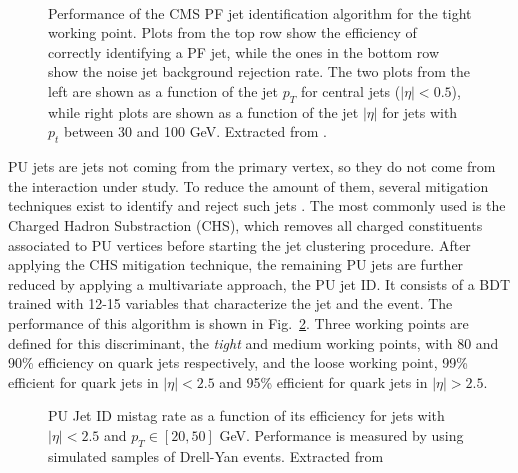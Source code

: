 \documentclass[../main.tex]{subfiles}
\begin{document}
\begin{figure}[h!]
\begin{center}
\\
\end{center}
\caption[Performance of the CMS PF jet identification algorithm]{Performance of the CMS PF jet identification algorithm for the tight working point. Plots from the top row show the efficiency of correctly identifying a PF jet, while the ones in the bottom row show the noise jet background rejection rate. The two plots from the left are shown as a function of the jet $p_T$ for central jets ($|\eta|<0.5$), while right plots are shown as a function of the jet $|\eta|$ for jets with $p_t$ between 30 and 100 GeV. Extracted from \cite{intro:id:pfjetid}.}
\label{intro:fig:jetid}
\end{figure}

PU jets are jets not coming from the primary vertex, so they do not come from the interaction under study. To reduce the amount of them, several mitigation techniques exist to identify and reject such jets \cite{intro:id:pujet}. The most commonly used is the Charged Hadron Substraction (CHS), which removes all charged constituents associated to PU vertices before starting the jet clustering procedure. After applying the CHS mitigation technique, the remaining PU jets are further reduced by applying a multivariate approach, the PU jet ID. It consists of a BDT trained with 12-15 variables that characterize the jet and the event. The performance of this algorithm is shown in Fig.~\ref{intro:fig:pujetid}.  Three working points are defined for this discriminant, the \textit{tight} and medium working points, with 80 and 90\% efficiency on quark jets respectively, and the loose working point, 99\% efficient for quark jets in $|\eta|<2.5$ and 95\% efficient for quark jets in $|\eta|>2.5$.


\begin{figure}[h!]
\begin{center}
\end{center}
\caption[PU Jet ID mistag rate ]{PU Jet ID mistag rate as a function of its efficiency for jets with $|\eta|<2.5$ and $p_T\in[20, 50]$ GeV. Performance is measured by using simulated samples of Drell-Yan events. Extracted from \cite{intro:id:pujetid}}
\label{intro:fig:pujetid}
\end{figure}
\end{document}
